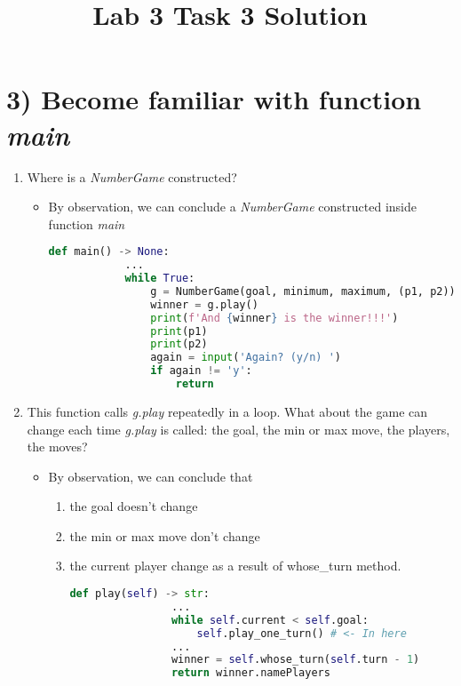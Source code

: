 \documentclass[12pt]{article}
\begin{document}
\title{Lab 3 Task 3 Solution}
\date{}
\maketitle


\section*{3) Become familiar with function \textit{main}}
\begin{enumerate}[1.]
    \item Where is a \textit{NumberGame} constructed?

    \begin{itemize}
        \item
        By observation, we can conclude a \textit{NumberGame} constructed
        inside function \textit{main}

        \begin{lstlisting}[language=Python]
        def main() -> None:
            ...
            while True:
                g = NumberGame(goal, minimum, maximum, (p1, p2)) #<- Here!!
                winner = g.play()
                print(f'And {winner} is the winner!!!')
                print(p1)
                print(p2)
                again = input('Again? (y/n) ')
                if again != 'y':
                    return

        \end{lstlisting}
    \end{itemize}

    \item This function calls \textit{g.play} repeatedly in a loop. What about the
    game can change each time \textit{g.play} is called: the goal, the min or max
    move, the players, the moves?

    \begin{itemize}
        \item

        By observation, we can conclude that

        \begin{enumerate}[1.]
            \item the goal doesn't change
            \item the min or max move don't change
            \item the current player change as a result of whose\_turn method.

            \begin{lstlisting}[language=Python]
            def play(self) -> str:
                ...
                while self.current < self.goal:
                    self.play_one_turn() # <- In here
                ...
                winner = self.whose_turn(self.turn - 1)
                return winner.namePlayers


\end{lstlisting}
\end{enumerate}
\end{itemize}
\end{enumerate}
\end{document}
